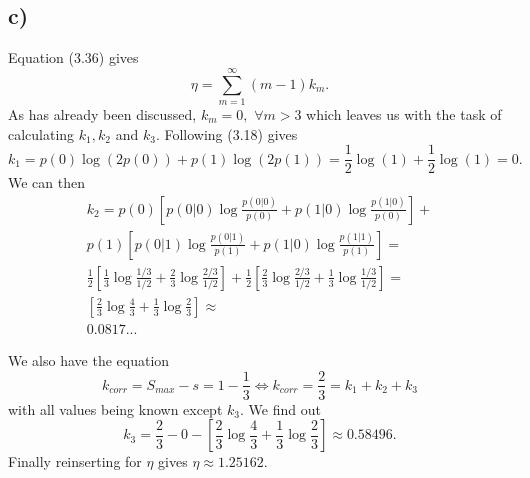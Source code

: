 \documentclass[a4paper, 12pt]{article}
\begin{document}
\subsection*{c)}
Equation (3.36) gives
\begin{equation}
    \eta = \sum_{m=1}^{\infty} (m-1)k_m.
\end{equation}
As has already been discussed, $k_m = 0,\,\, \forall m > 3$ which leaves us with the task of calculating $k_1, k_2$ and $k_3$. Following (3.18) gives
\begin{equation}
    k_1 = p(0) \log(2p(0)) + p(1) \log(2p(1)) = \frac{1}{2} \log(1) + \frac{1}{2} \log(1) = 0.
\end{equation}
We can then
\begin{equation}
    \begin{split}
        k_2 = p(0) \left[p(0|0) \log \frac{p(0|0)}{p(0)} + p(1|0) \log \frac{p(1|0)}{p(0)}\right] + \\
        p(1) \left[p(0|1) \log \frac{p(0|1)}{p(1)} + p(1|0) \log \frac{p(1|1)}{p(1)}\right] = \\
        \frac{1}{2} \left[ \frac{1}{3} \log \frac{1/3}{1/2} + \frac{2}{3} \log \frac{2/3}{1/2} \right] +
        \frac{1}{2} \left[ \frac{2}{3} \log \frac{2/3}{1/2} + \frac{1}{3} \log \frac{1/3}{1/2} \right] = \\
        \left[ \frac{2}{3} \log \frac{4}{3} + \frac{1}{3} \log \frac{2}{3} \right]  \approx\\
        0.0817...
    \end{split}
\end{equation}

We also have the equation
\begin{equation}
    k_{corr} = S_{max} - s = 1 - \frac{1}{3} \iff k_{corr} = \frac{2}{3} = k_1 + k_2 + k_3
\end{equation}
with all values being known except $k_3$. We find out
\begin{equation}
    k_3 = \frac{2}{3} - 0 - \left[ \frac{2}{3} \log \frac{4}{3} + \frac{1}{3} \log \frac{2}{3} \right] \approx 0.58496.
\end{equation}
Finally reinserting for $\eta$ gives $\eta \approx 1.25162$.
\end{document}
